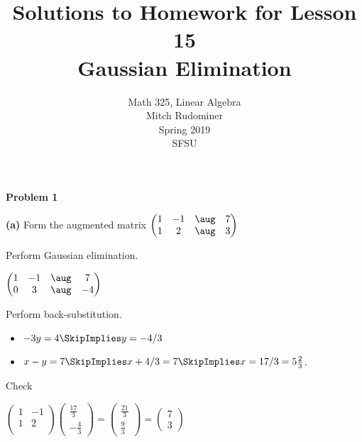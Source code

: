 \documentclass[oneside,12pt]{amsart}
\begin{document}
\title{Solutions to Homework for Lesson 15 \\ Gaussian Elimination}
\author{Math 325, Linear Algebra \\ Mitch Rudominer \\ Spring 2019 \\ SFSU }
\date{}

\maketitle


\textbf{Problem 1}

\bigskip


\textbf{(a)} Form the augmented matrix
$
\begin{pmatrix}
 1 & -1 &  \aug & 7  \\
 1 &  2 &  \aug & 3  \\
\end{pmatrix}
$

Perform Gaussian elimination.


\bigskip

$
\begin{pmatrix}
 1 & -1 &  \aug & 7  \\
 0 &  3 &  \aug & -4  \\
\end{pmatrix}
$


\bigskip

Perform back-substitution.

\begin{itemize}
\item $-3y = 4  \SkipImplies y = -4/3$
\item $x-y=7 \SkipImplies x+4/3=7 \SkipImplies x = 17/3 = 5 \frac{2}{3}$.
\end{itemize}

\bigskip

Check

\bigskip

$
\begin{pmatrix}
 1 & -1 \\
 1 & 2 \\
\end{pmatrix}
\begin{pmatrix}
 \frac{17}{3} \\[6pt]
 -\frac{4}{3}
\end{pmatrix}
=
\begin{pmatrix}
 \frac{21}{3} \\[6pt]
 \frac{9}{3}
\end{pmatrix}
=
\begin{pmatrix}
 7 \\
3
\end{pmatrix}
$
\end{document}
